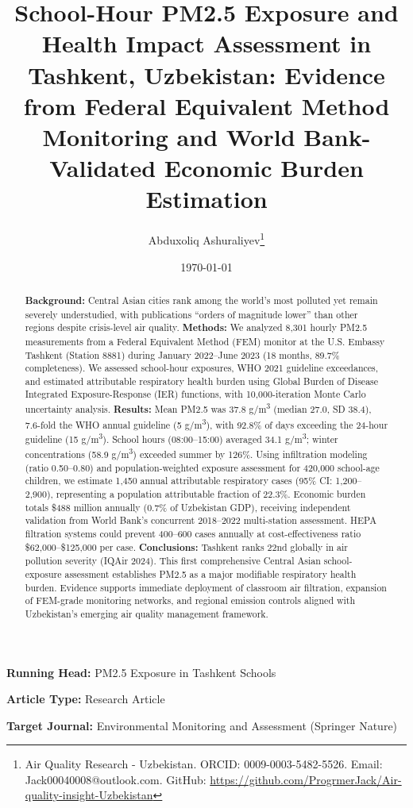 \documentclass[11pt,a4paper]{article}
\title{School-Hour PM2.5 Exposure and Health Impact Assessment in Tashkent, Uzbekistan: Evidence from Federal Equivalent Method Monitoring and World Bank-Validated Economic Burden Estimation}
\author{Abduxoliq Ashuraliyev\thanks{Air Quality Research - Uzbekistan. ORCID: 0009-0003-5482-5526. Email: Jack00040008@outlook.com. GitHub: \url{https://github.com/ProgrmerJack/Air-quality-insight-Uzbekistan}}}
\date{\today}
\begin{document}
\maketitle

\noindent\textbf{Running Head:} PM2.5 Exposure in Tashkent Schools

\noindent\textbf{Article Type:} Research Article

\noindent\textbf{Target Journal:} Environmental Monitoring and Assessment (Springer Nature)

\vspace{0.5cm}

\begin{abstract}
\textbf{Background:} Central Asian cities rank among the world's most polluted yet remain severely understudied, with publications ``orders of magnitude lower'' than other regions despite crisis-level air quality. \textbf{Methods:} We analyzed 8,301 hourly PM2.5 measurements from a Federal Equivalent Method (FEM) monitor at the U.S. Embassy Tashkent (Station 8881) during January 2022--June 2023 (18 months, 89.7\% completeness). We assessed school-hour exposures, WHO 2021 guideline exceedances, and estimated attributable respiratory health burden using Global Burden of Disease Integrated Exposure-Response (IER) functions, with 10,000-iteration Monte Carlo uncertainty analysis. \textbf{Results:} Mean PM2.5 was 37.8 \textmu g/m\textsuperscript{3} (median 27.0, SD 38.4), 7.6-fold the WHO annual guideline (5 \textmu g/m\textsuperscript{3}), with 92.8\% of days exceeding the 24-hour guideline (15 \textmu g/m\textsuperscript{3}). School hours (08:00--15:00) averaged 34.1 \textmu g/m\textsuperscript{3}; winter concentrations (58.9 \textmu g/m\textsuperscript{3}) exceeded summer by 126\%. Using infiltration modeling (ratio 0.50--0.80) and population-weighted exposure assessment for 420,000 school-age children, we estimate 1,450 annual attributable respiratory cases (95\% CI: 1,200--2,900), representing a population attributable fraction of 22.3\%. Economic burden totals \$488 million annually (0.7\% of Uzbekistan GDP), receiving independent validation from World Bank's concurrent 2018--2022 multi-station assessment. HEPA filtration systems could prevent 400--600 cases annually at cost-effectiveness ratio \$62,000--\$125,000 per case. \textbf{Conclusions:} Tashkent ranks 22nd globally in air pollution severity (IQAir 2024). This first comprehensive Central Asian school-exposure assessment establishes PM2.5 as a major modifiable respiratory health burden. Evidence supports immediate deployment of classroom air filtration, expansion of FEM-grade monitoring networks, and regional emission controls aligned with Uzbekistan's emerging air quality management framework.
\end{abstract}
\end{document}
